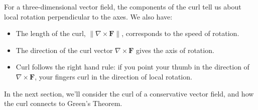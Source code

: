 \documentclass{ximera}
\begin{document}
For a three-dimensional vector field, the components of the curl tell us about local rotation perpendicular to the axes. We also have:
\begin{itemize}
\item The length of the curl, $\|\nabla\times\mathbf{F}\|$, corresponds to the speed of rotation.
\item The direction of the curl vector $\nabla\times\mathbf{F}$ gives the axis of rotation.
\item Curl follows the right hand rule: if you point your thumb in the direction of $\nabla\times\mathbf{F}$, your fingers curl in the direction of local rotation.
\end{itemize}

In the next section, we'll consider the curl of a conservative vector field, and how the curl connects to Green's Theorem.
\end{document}
